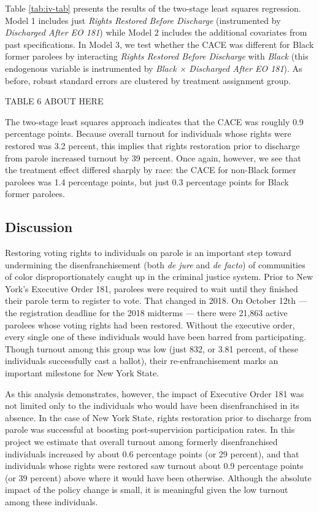 \documentclass[
  12pt,
]{article}
\begin{document}
Table \ref{tab:iv-tab} presents the results of the two-stage least squares regression. Model 1 includes just \emph{Rights Restored Before Discharge} (instrumented by \emph{Discharged After EO 181}) while Model 2 includes the additional covariates from past specifications. In Model 3, we test whether the CACE was different for Black former parolees by interacting \emph{Rights Restored Before Discharge} with \emph{Black} (this endogenous variable is instrumented by \emph{Black × Discharged After EO 181}). As before, robust standard errors are clustered by treatment assignment group.

TABLE 6 ABOUT HERE

The two-stage least squares approach indicates that the CACE was roughly 0.9 percentage points. Because overall turnout for individuals whose rights were restored was 3.2 percent, this implies that rights restoration prior to discharge from parole increased turnout by 39 percent. Once again, however, we see that the treatment effect differed sharply by race: the CACE for non-Black former parolees was 1.4 percentage points, but just 0.3 percentage points for Black former parolees.

\hypertarget{discussion}{%
\subsection*{Discussion}\label{discussion}}

Restoring voting rights to individuals on parole is an important step toward undermining the disenfranchisement (both \emph{de jure} and \emph{de facto}) of communities of color disproportionately caught up in the criminal justice system. Prior to New York's Executive Order 181, parolees were required to wait until they finished their parole term to register to vote. That changed in 2018. On October 12th --- the registration deadline for the 2018 midterms --- there were 21,863 active parolees whose voting rights had been restored. Without the executive order, every single one of these individuals would have been barred from participating. Though turnout among this group was low (just 832, or 3.81 percent, of these individuals successfully cast a ballot), their re-enfranchisement marks an important milestone for New York State.

As this analysis demonstrates, however, the impact of Executive Order 181 was not limited only to the individuals who would have been disenfranchised in its absence. In the case of New York State, rights restoration prior to discharge from parole was successful at boosting post-supervision participation rates. In this project we estimate that overall turnout among formerly disenfranchised individuals increased by about 0.6 percentage points (or 29 percent), and that individuals whose rights were restored saw turnout about 0.9 percentage points (or 39 percent) above where it would have been otherwise. Although the absolute impact of the policy change is small, it is meaningful given the low turnout among these individuals.
\end{document}
